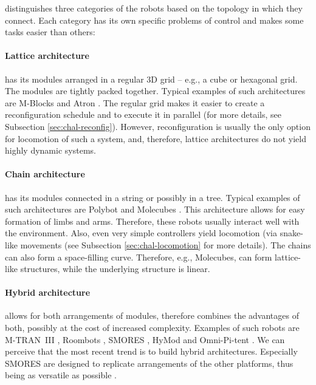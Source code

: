 \textcite{4141032} distinguishes three categories of the robots based on the
topology in which they connect. Each category has its own specific problems of
control and makes some tasks easier than others:

\paragraph{Lattice architecture} has its modules arranged in a regular 3D grid
-- e.g., a cube or hexagonal grid. The modules are tightly packed together.
Typical examples of such architectures are M-Blocks
\cite{DBLP:conf/iros/RomanishinGR13} and Atron
\cite{DBLP:conf/iros/JorgensenOL04}. The regular grid makes it easier to create
a reconfiguration schedule and to execute it in parallel (for more details, see
Subsection \ref{sec:chal-reconfig}). However, reconfiguration is usually the
only option for locomotion of such a system, and, therefore, lattice
architectures do not yield highly dynamic systems.

\paragraph{Chain architecture} has its modules connected in a string or possibly
in a tree. Typical examples of such architectures are Polybot
\cite{DBLP:conf/icra/YimDR00} and Molecubes
\cite{DBLP:journals/trob/ZykovMDL07}. This architecture allows for easy
formation of limbs and arms. Therefore, these robots usually interact well with
the environment. Also, even very simple controllers yield locomotion (via
snake-like movements (see Subsection \ref{sec:chal-locomotion} for more
details). The chains can also form a space-filling curve. Therefore, e.g.,
Molecubes, can form lattice-like structures, while the underlying structure is
linear.

\paragraph{Hybrid architecture} allows for both arrangements of modules,
therefore combines the advantages of both, possibly at the cost of increased
complexity. Examples of such robots are M-TRAN~III
\cite{DBLP:journals/ijrr/KurokawaTKKHM08}, Roombots
\cite{DBLP:conf/icra/SprowitzBDI09}, SMORES \cite{DBLP:conf/iros/DaveyKY12},
HyMod \cite{DBLP:conf/dars/ParrottDG16} and Omni-Pi-tent
\cite{DBLP:conf/taros/PeckTT19}. We can perceive that the most recent trend is
to build hybrid architectures. Especially SMORES are designed to replicate
arrangements of the other platforms, thus being as versatile as possible
\cite{DBLP:conf/iros/DaveyKY12}.

